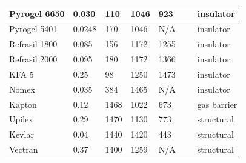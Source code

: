 \begin{table}[H]
\begin{tabular}{|l|l|l|l|l|l|l|}
		Pyrogel 6650      & 0.030                                                 & 110                                        & 1046                                            & 923    & ~        & insulator                                  \\ \hline
		Pyrogel 5401      & 0.0248                                                & 170                                        & 1046                                            & N/A  	 & ~          & insulator                                 \\ \hline
		Refrasil 1800      & 0.085                                                 & 156                                        & 1172                                            & 1255 	 & ~           & insulator                                \\ \hline
		Refrasil 2000      & 0.095                                                 & 180                                        & 1172                                            & 1366 	 & ~            & insulator                               \\ \hline
		KFA 5             & 0.25                                                  & 98                                         & 1250                                            & 1473 	 & ~        & insulator                                   \\ \hline
		Nomex             & 0.035                                                  & 384                                         & 1465                                            & N/A 	 & ~        & insulator                                   \\ \hline
		Kapton            & 0.12                                                  & 1468                                       & 1022                                            & 673	 & ~            & gas barrier                              \\ \hline
		Upilex            & 0.29                                                  & 1470                                       & 1130                                            & 773 	 & ~             & structural                            \\ \hline
				Kevlar            & 0.04 & 1440                                       & 1420                                            & 443 	 & ~             & structural                            \\ \hline
		Vectran            & 0.37 & 1400 & 1259 & N/A 	 &  & structural                            \\ \hline
	\end{tabular}
	\label{tab:tpsmatprop}
\end{table}

